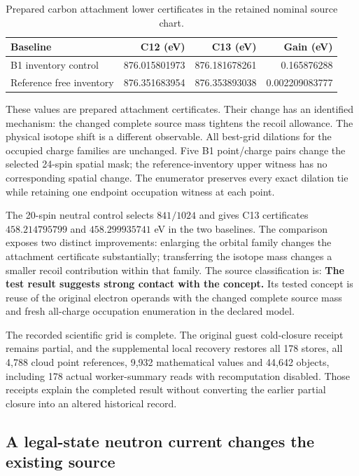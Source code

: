 \begin{table}[htbp]
\centering\small
\caption{Prepared carbon attachment lower certificates in the retained nominal source chart.}
\begin{tabular}{lrrr}\toprule
Baseline & C12 (eV) & C13 (eV) & Gain (eV)\\\midrule
B1 inventory control &876.015801973&876.181678261&0.165876288\\
Reference free inventory &876.351683954&876.353893038&0.002209083777\\\bottomrule
\end{tabular}
\end{table}

These values are prepared attachment certificates. Their change has an identified mechanism: the changed complete source mass tightens the recoil allowance. The physical isotope shift is a different observable. All best-grid dilations for the occupied charge families are unchanged. Five B1 point/charge pairs change the selected 24-spin spatial mask; the reference-inventory upper witness has no corresponding spatial change. The enumerator preserves every exact dilation tie while retaining one endpoint occupation witness at each point.

The 20-spin neutral control selects $841/1024$ and gives C13 certificates $458.214795799$ and $458.299935741$ eV in the two baselines. The comparison exposes two distinct improvements: enlarging the orbital family changes the attachment certificate substantially; transferring the isotope mass changes a smaller recoil contribution within that family. The source classification is: \textbf{The test result suggests strong contact with the concept.} Its tested concept is reuse of the original electron operands with the changed complete source mass and fresh all-charge occupation enumeration in the declared model.

The recorded scientific grid is complete. The original guest cold-closure receipt remains partial, and the supplemental local recovery restores all 178 stores, all 4,788 cloud point references, 9,932 mathematical values and 44,642 objects, including 178 actual worker-summary reads with recomputation disabled. Those receipts explain the completed result without converting the earlier partial closure into an altered historical record.

\subsection{A legal-state neutron current changes the existing source}


